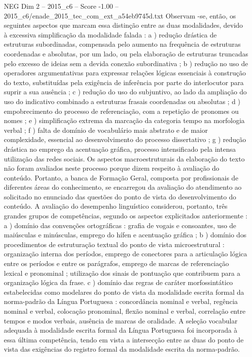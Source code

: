 \begin{textsample}{NEG Dim 2 – 2015\_c6 – Score -1.00 – 2015\_c6/enade\_2015\_tec\_com\_ext\_a54eb9745d.txt}
Observam -se, então, os seguintes aspectos que marcam essa distinção entre as duas modalidades, devido à excessiva simplificação da modalidade falada : a ) redução drástica de estruturas subordinadas, compensada pelo aumento na frequência de estruturas coordenadas e absolutas, por um lado, ou pela elaboração de estruturas truncadas pelo excesso de ideias sem a devida conexão subordinativa ; b ) redução no uso de operadores argumentativas para expressar relações lógicas essenciais à construção do texto, substituídas pela exigência de inferência por parte do interlocutor para suprir a sua ausência ; c ) redução do uso do subjuntivo, ao lado da ampliação do uso do indicativo combinado a estruturas frasais coordenadas ou absolutas ; d ) empobrecimento do processo de referenciação, com a repetição de pronomes ou nomes ; e ) simplificação extrema da marcação da categoria tempo na morfologia verbal ; f ) falta de domínio de vocabulário mais abstrato e de maior complexidade, essencial ao desenvolvimento do processo dissertativo ; g ) redução drástica no emprego da acentuação gráfica, processo intensificado pela intensa utilização das redes sociais.
Os aspectos macroestruturais da elaboração do texto não foram avaliados neste processo porque dizem respeito à avaliação do conteúdo.
Portanto, a banca de Formação Geral, composta por profissionais de diferentes áreas do conhecimento, se encarregou da avaliação do atendimento ao solicitado no enunciado das questões do ponto de vista do desenvolvimento do conteúdo.
A avaliação do desempenho linguístico considerou, portanto, três grandes grupos de competências, segundo os aspectos explicitados anteriormente : a ) domínio das convenções ortográficas : grafia de vogais e consoantes, uso de maiúsculas e minúsculas, emprego do hífen e acentuação gráfica ; b ) domínio dos procedimentos de estruturação textual do ponto de vista microestrutural : organização interna dos períodos, emprego de conectores para a articulação lógica entre os períodos e entre os parágrafos, emprego de marcas de referenciação lexical e pronominal ; utilização dos sinais de pontuação que contribuem para a organização lógica da frase. c ) domínio das regras de caráter morfossintático estabelecidas como modelares do ponto de vista da modalidade escrita formal da norma-padrão da Língua Portuguesa : concordância nominal e verbal, regência nominal e verbal, colocação pronominal, flexão nominal e verbal, correlação entre tempos e modos verbais, ausência de marcas de oralidade.
A seleção vocabular adequada à modalidade escrita formal da Língua Portuguesa foi incorporada à essa última competência, tendo em vista a intersecção entre as duas do ponto de vista das exigências do registro formal da modalidade escrita da norma-padrão.

\end{textsample}
